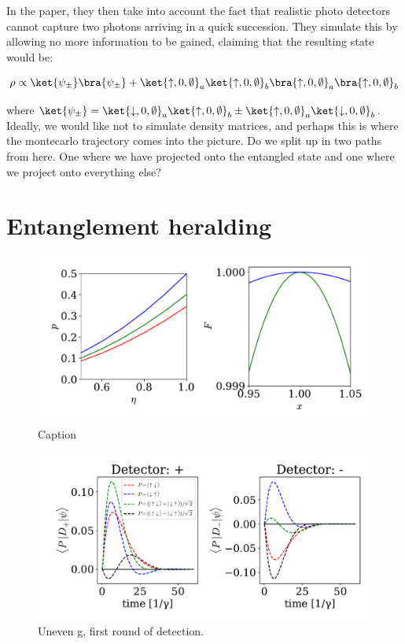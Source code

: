In the paper, they then take into account the fact that realistic photo detectors cannot capture two photons arriving in a quick succession. They simulate this by allowing no more information to be gained, claiming that the resulting state would be:

\begin{equation}
    \rho \propto \ket{\psi_\pm} \bra{\psi_\pm} + \ket{\uparrow,0,\emptyset}_a\ket{\uparrow,0,\emptyset}_b \bra{\uparrow,0,\emptyset}_a\bra{\uparrow,0,\emptyset}_b
\end{equation}

where $\ket{\psi_\pm} = \ket{\downarrow,0,\emptyset}_a \ket{\uparrow,0,\emptyset}_b \pm \ket{\uparrow,0,\emptyset}_a \ket{\downarrow,0,\emptyset}_b$. Ideally, we would like not to simulate density matrices, and perhaps this is where the montecarlo trajectory comes into the picture. Do we split up in two paths from here. One where we have projected onto the entangled state and one where we project onto everything else?



\section{Entanglement heralding}
\begin{figure}[H]
    \centering
    \includegraphics[width = 0.5 \linewidth]{figures/barett_fig2.pdf}
    \caption{Caption}
    \label{fig:my_label}
\end{figure}

\begin{figure}[H]
    \centering
    \includegraphics[width = 0.5 \linewidth]{figures/barett_uneven_g_first_detection.pdf}
    \caption{Uneven g, first round of detection.}
    \label{fig:my_label}
\end{figure}

